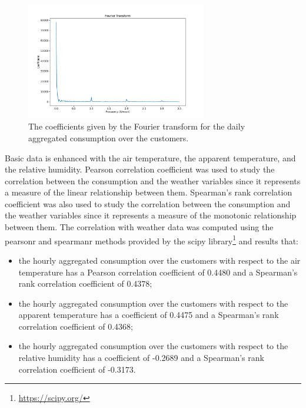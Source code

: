 \begin{figure}[H]
\centering
\includegraphics[width=0.7\textwidth]{images/demand/ft_day}
\caption{The coefficients given by the Fourier transform for the daily aggregated consumption over the customers.}
\label{fig:demandftday}
\end{figure}

Basic data is enhanced with the air temperature, the apparent temperature, and the relative humidity.
Pearson correlation coefficient was used to study the correlation between the consumption and the weather variables since it represents a measure of the linear relationship between them.
Spearman's rank correlation coefficient was also used to study the correlation between the consumption and the weather variables since it represents a measure of the monotonic relationship between them.
The correlation with weather data was computed using the pearsonr and spearmanr methods provided by the scipy library\footnote{ \url{https://scipy.org/} } and results that:
\begin{itemize}
  \item the hourly aggregated consumption over the customers with respect to the air temperature has a Pearson correlation coefficient of 0.4480 and a Spearman's rank correlation coefficient of 0.4378;
  \item the hourly aggregated consumption over the customers with respect to the apparent temperature has a coefficient of 0.4475 and a Spearman's rank correlation coefficient of 0.4368;
  \item the hourly aggregated consumption over the customers with respect to the relative humidity has a coefficient of -0.2689 and a Spearman's rank correlation coefficient of -0.3173.
\end{itemize}


